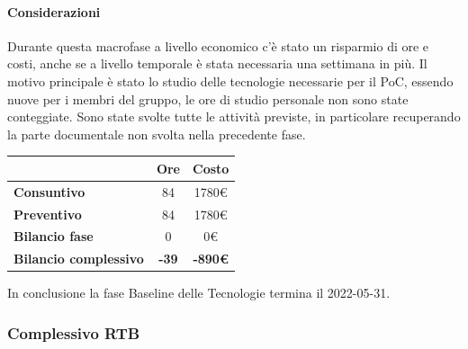 \paragraph{Considerazioni} \hfill \break
Durante questa macrofase a livello economico c'è stato un risparmio di ore e costi, anche se a livello temporale è stata necessaria una settimana in più.
Il motivo principale è stato lo studio delle tecnologie necessarie per il PoC, essendo nuove per i membri del gruppo, le ore di studio personale non sono state conteggiate. \newline
Sono state svolte tutte le attività previste, in particolare recuperando la parte documentale non svolta nella precedente fase.
\begin{center}
	\renewcommand{\arraystretch}{1.8}
	\begin{tabular}{ | l |c|c| }
    \hline
    & \textbf{Ore} & \textbf{Costo} \\
	\hline
    \textbf{Consuntivo} & 84 & 1780\euro \\
    \hline
    \textbf{Preventivo} & 84 & 1780\euro \\
    \hline
    \textbf{Bilancio fase} & 0 & 0\euro \\
    \hline
    \textbf{Bilancio complessivo} & \textbf{-39} & \textbf{-890\euro} \\
    \hline
    \end{tabular}
\end{center}
In conclusione la fase Baseline delle Tecnologie termina il 2022-05-31.


\subsubsection{Complessivo RTB}

